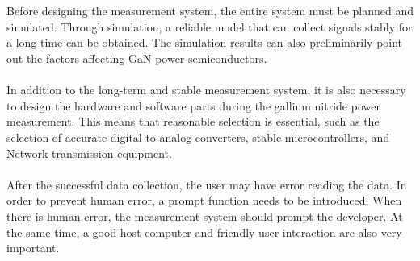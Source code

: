 \\
\\
Before designing the measurement system, the entire system must be planned and simulated. Through simulation, a reliable model that can collect signals stably for a long time can be obtained. The simulation results can also preliminarily point out the factors affecting GaN power semiconductors.
\\
\\
In addition to the long-term and stable measurement system, it is also necessary to design the hardware and software parts during the gallium nitride power measurement. This means that reasonable selection is essential, such as the selection of accurate digital-to-analog converters, stable microcontrollers, and Network transmission equipment.
\\
\\
After the successful data collection, the user may have error reading the data. In order to prevent human error, a prompt function needs to be introduced. When there is human error, the measurement system should prompt the developer. At the same time, a good host computer and friendly user interaction are also very important.
\\



